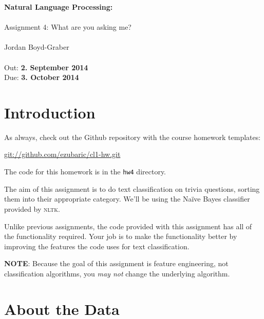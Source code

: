 \documentclass[11pt]{article}
\begin{document}
\begin{center}
{\Large{\textbf{ Natural Language Processing:  }}}\\
\mbox{}\\
{\Large{Assignment 4: What are you asking me?}}\\
\mbox{}\\
{\large{Jordan Boyd-Graber}}\\
\mbox{}\\
{\large{Out: \textbf{2. September 2014}\\Due: \textbf{3. October 2014}}}\\
\end{center}


{}

\section*{Introduction} %
\label{sec:introduction}
As always, check out the Github repository with the course homework templates:

\url{git://github.com/ezubaric/cl1-hw.git}

The code for this homework is in the \texttt{hw4} directory.

The aim of this assignment is to do text classification on trivia questions, sorting them into their appropriate category.  We'll be using the Na\"ive Bayes classifier provided by \textsc{nltk}.

Unlike previous assignments, the code provided with this assignment has all of the functionality required.  Your job is to make the functionality better by improving the features the code uses for text classification.  

{\bf NOTE}: Because the goal of this assignment is feature engineering, not classification algorithms, you \emph{may not} change the underlying algorithm.  

\section*{About the Data}
\end{document}
